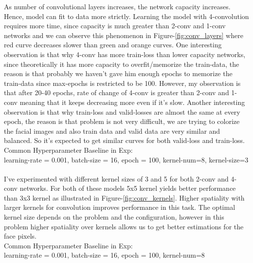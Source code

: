 \documentclass[12pt]{article}
\begin{document}
    \vspace*{0.5cm}
    \begin{center}
        \raggedright
        As number of convolutional layers increases, the network capacity increases. Hence, model can fit to data more strictly.
        Learning the model with 4-convolution requires more time, since capacity is much greater than 2-conv and 1-conv networks and we can observe this phenomenon in Figure-\ref*{fig:conv_layers}
        where red curve decreases slower than green and orange curves. One interesting observation is that why 4-conv has more train-loss than lower capacity networks, since theoretically it has more capacity
        to overfit/memorize the train-data, the reason is that probably we haven't gave him enough epochs to memorize the train-data since max-epochs is restricted to be 100. 
        However, my observation is that after 20-40 epochs, rate of change of 4-conv is greater than 2-conv and 1-conv meaning that 
        it keeps decreasing more even if it's slow. Another interesting observation is that why train-loss and valid-losses are almost the same at every epoch, the reason is that
        problem is not very difficult, we are trying to colorize the facial images and also train data and valid data are very similar and balanced.
        So it's expected to get similar curves for both valid-loss and train-loss.
        \\
        Common Hyperparameter Baseline in Exp: \\
        learning-rate = 0.001, batch-size = 16, epoch = 100, kernel-num=8, kernel-size=3
        \\~\\

        I've experimented with different kernel sizes of 3 and 5 for both 2-conv and 4-conv networks.
        For both of these models 5x5 kernel yields better performance than 3x3 kernel as illustrated in Figure-\ref*{fig:conv_kernels}.
        Higher spatiality with larger kernels for convolution improves performance in this task. 
        The optimal kernel size depends on the problem and the configuration, however in this problem higher spatiality over kernels allows us to get better estimations
        for the face pixels.
        \\
        Common Hyperparameter Baseline in Exp: \\
        learning-rate = 0.001, batch-size = 16, epoch = 100, kernel-num=8
        \\~\\


\end{center}
\end{document}
